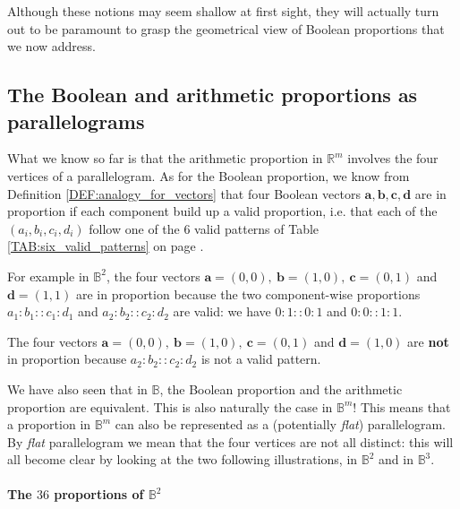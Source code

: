 Although these notions may seem shallow at first sight, they will actually turn
out to be paramount to grasp the geometrical view of Boolean proportions that
we now address.

\subsection{The Boolean and arithmetic proportions as parallelograms}

What we know so far is that the arithmetic proportion in $\mathbb{R}^m$
involves the four vertices of a parallelogram. As for the Boolean proportion,
we know from Definition \ref{DEF:analogy_for_vectors} that four Boolean vectors
$\mathbf{a}, \mathbf{b}, \mathbf{c}, \mathbf{d}$ are in proportion if each
component build up a valid proportion, i.e. that each of the $(a_i, b_i, c_i,
d_i)$ follow one of the $6$ valid patterns of Table
\ref{TAB:six_valid_patterns} on page \pageref{TAB:six_valid_patterns}.
\begin{testexample}
For example in $\mathbb{B}^2$, the four vectors $\mathbf{a} = (0, 0),~
  \mathbf{b} = (1, 0),~ \mathbf{c} = (0, 1)$ and $\mathbf{d} = (1, 1)$ are in
  proportion because the two component-wise proportions $a_1 : b_1 :: c_1 :
  d_1$ and $a_2 : b_2 :: c_2:d_2$ are valid: we have $0: 1 :: 0: 1$ and
  $0:0::1:1$.

  The four vectors $\mathbf{a} = (0, 0),~ \mathbf{b} = (1, 0),~ \mathbf{c} =
  (0, 1)$ and $\mathbf{d} = (1, 0)$ are \textbf{not} in proportion because $a_2
  : b_2 :: c_2 : d_2$ is not a valid pattern.
\end{testexample}

We have also seen that in $\mathbb{B}$, the Boolean
proportion and the arithmetic proportion are equivalent. This is also naturally
the case in $\mathbb{B}^m$! This means that a proportion in $\mathbb{B}^m$ can
also be represented as a (potentially \textit{flat}) parallelogram. By
\textit{flat} parallelogram we mean that the four vertices are not all
distinct: this will all become clear by looking at the two following
illustrations, in $\mathbb{B}^2$ and in $\mathbb{B}^3$.

\paragraph{The $36$ proportions of $\mathbb{B}^2$\\}

